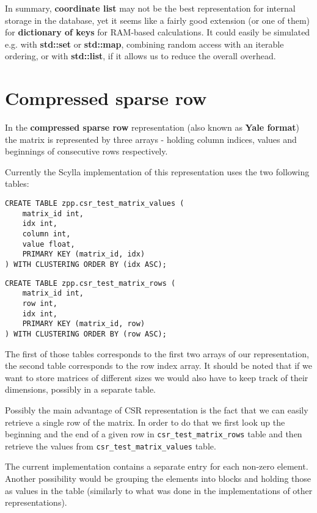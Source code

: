 \documentclass{article}
\newcommand{\code}[0]{\texttt}
\begin{document}
In summary, \textbf{coordinate list} may not be the best representation for internal storage in the database, yet it seems like a fairly good extension (or one of them) for \textbf{dictionary of keys} for RAM-based calculations. It could easily be simulated e.g. with \textbf{std::set} or \textbf{std::map}, combining random access with an iterable ordering, or with \textbf{std::list}, if it allows us to reduce the overall overhead.

\pagebreak
\section{Compressed sparse row}

In the \textbf{compressed sparse row} representation (also known as \textbf{Yale format}) the matrix is represented by three arrays - holding column indices, values and beginnings of consecutive rows respectively.

Currently the Scylla implementation of this representation uses the two following tables:

\begin{lstlisting}[style=SQLStyle]
CREATE TABLE zpp.csr_test_matrix_values (
	matrix_id int,
	idx int,
	column int,
	value float,
	PRIMARY KEY (matrix_id, idx)
) WITH CLUSTERING ORDER BY (idx ASC);
\end{lstlisting}

\begin{lstlisting}[style=SQLStyle]
CREATE TABLE zpp.csr_test_matrix_rows (
	matrix_id int,
	row int,
	idx int,
	PRIMARY KEY (matrix_id, row)
) WITH CLUSTERING ORDER BY (row ASC);
\end{lstlisting}

The first of those tables corresponds to the first two arrays of our representation, the second table corresponds to the row index array. It should be noted that if we want to store matrices of different sizes we would also have to keep track of their dimensions, possibly in a separate table.

Possibly the main advantage of CSR representation is the fact that we can easily retrieve a single row of the matrix. In order to do that we first look up the beginning and the end of a given row in \code{csr\_test\_matrix\_rows} table and then retrieve the values from \code{csr\_test\_matrix\_values} table.

The current implementation contains a separate entry for each non-zero element. Another possibility would be grouping the elements into blocks and holding those as values in the table (similarly to what was done in the implementations of other representations).
\end{document}
